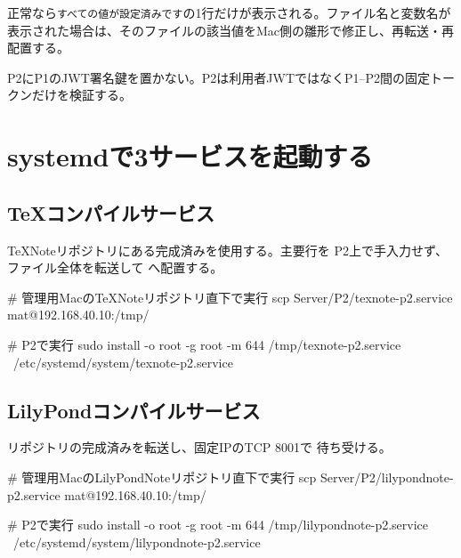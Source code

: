 \documentclass[uplatex,a4paper,11pt]{jsarticle}
\begin{document}
正常なら\texttt{すべての値が設定済みです}の1行だけが表示される。ファイル名と変数名が
表示された場合は、そのファイルの該当値をMac側の雛形で修正し、再転送・再配置する。

P2にP1のJWT署名鍵を置かない。P2は利用者JWTではなくP1--P2間の固定トークンだけを検証する。

\section{systemdで3サービスを起動する}

\subsection{TeXコンパイルサービス}

TeXNoteリポジトリにある完成済みを使用する。主要行を
P2上で手入力せず、ファイル全体を転送して
へ配置する。

\begin{command}
# 管理用MacのTeXNoteリポジトリ直下で実行
scp Server/P2/texnote-p2.service mat@192.168.40.10:/tmp/

# P2で実行
sudo install -o root -g root -m 644 /tmp/texnote-p2.service \
  /etc/systemd/system/texnote-p2.service
\end{command}



\subsection{LilyPondコンパイルサービス}

リポジトリの完成済みを転送し、固定IPのTCP 8001で
待ち受ける。

\begin{command}
# 管理用MacのLilyPondNoteリポジトリ直下で実行
scp Server/P2/lilypondnote-p2.service mat@192.168.40.10:/tmp/

# P2で実行
sudo install -o root -g root -m 644 /tmp/lilypondnote-p2.service \
  /etc/systemd/system/lilypondnote-p2.service
\end{command}


\end{document}
